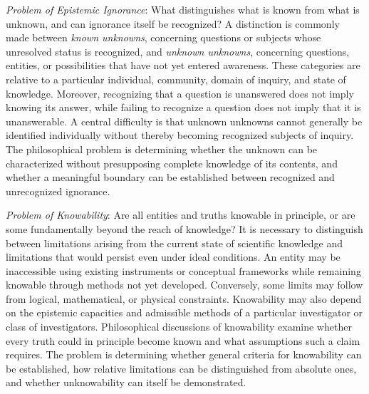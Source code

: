 \emph{Problem of Epistemic Ignorance}: What distinguishes what is known from what is unknown, and can ignorance itself be recognized? A distinction is commonly made between \emph{known unknowns}, concerning questions or subjects whose unresolved status is recognized, and \emph{unknown unknowns}, concerning questions, entities, or possibilities that have not yet entered awareness. These categories are relative to a particular individual, community, domain of inquiry, and state of knowledge. Moreover, recognizing that a question is unanswered does not imply knowing its answer, while failing to recognize a question does not imply that it is unanswerable. A central difficulty is that unknown unknowns cannot generally be identified individually without thereby becoming recognized subjects of inquiry. The philosophical problem is determining whether the unknown can be characterized without presupposing complete knowledge of its contents, and whether a meaningful boundary can be established between recognized and unrecognized ignorance.

\emph{Problem of Knowability}: Are all entities and truths knowable in principle, or are some fundamentally beyond the reach of knowledge? It is necessary to distinguish between limitations arising from the current state of scientific knowledge and limitations that would persist even under ideal conditions. An entity may be inaccessible using existing instruments or conceptual frameworks while remaining knowable through methods not yet developed. Conversely, some limits may follow from logical, mathematical, or physical constraints. Knowability may also depend on the epistemic capacities and admissible methods of a particular investigator or class of investigators. Philosophical discussions of knowability examine whether every truth could in principle become known and what assumptions such a claim requires. The problem is determining whether general criteria for knowability can be established, how relative limitations can be distinguished from absolute ones, and whether unknowability can itself be demonstrated.

